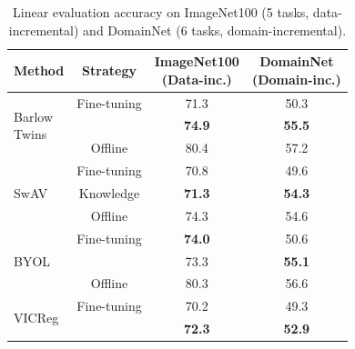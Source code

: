 \begin{table}[t]
\caption{Linear evaluation accuracy on ImageNet100 (5 tasks, data-incremental) and DomainNet (6 tasks, domain-incremental).}
\label{tab:domain-data-incremental}
\vspace{-8pt}
\setlength{\tabcolsep}{4pt}
\scriptsize
\centering
\captionsetup{type=table}
\begin{tabular}{lccc}
\toprule
\textbf{Method} & \textbf{Strategy} & \parbox{1.5cm}{\centering\textbf{ImageNet100}\\\textbf{(Data-inc.)}} & \parbox{1.5cm}{\centering\textbf{DomainNet}\\\textbf{(Domain-inc.)}} \\ 
\midrule
{}[1]{*}{{\parbox{1cm}{Barlow\\Twins}}}      & Fine-tuning & 71.3 & 50.3 \\
                             & \name{} 
                             & \textbf{74.9} & \textbf{55.5} \\ 
                             &  Offline & 80.4 & 57.2  \\
\midrule
{}[2]{*}{SwAV}      & Fine-tuning & 70.8 & 49.6 \\
                             & Knowledge 
                             & \textbf{71.3} & \textbf{54.3} \\ 
                             &  Offline & 74.3 & 54.6 \\
\midrule
{}[2]{*}{BYOL}      & Fine-tuning & \textbf{74.0} & 50.6 \\
                             & \name{} 
                             & 73.3 & \textbf{55.1}\\ 
                             &  Offline & 80.3 & 56.6 \\
\midrule
{}[2]{*}{VICReg}      & Fine-tuning & 70.2 & 49.3  \\
                             & \name{} 
                             & \textbf{72.3} & \textbf{52.9} \\ 

\end{tabular}
\end{table}
